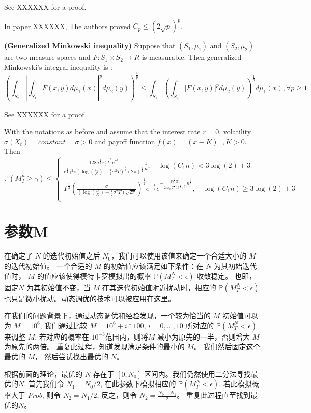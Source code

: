 See XXXXXX for a proof.

In paper XXXXXX, The authors proved $C_p\leq (2\sqrt{p})^p$.

\textbf{(Generalized Minkowski inequality)}
Suppose that $(S_1,\mu_1)$ and $(S_2,\mu_2)$ are two measure spaces and $F : S_1\times S_2\rightarrow R$ is measurable. Then generalized Minkowski's integral inequality is :
\begin{equation}
(\int_{S_2}|\int_{S_1}F(x,y)d\mu_1(x)|^pd\mu_2(y))^{\frac{1}{p}}\leq \int_{S_1}(\int_{S_2}|F(x,y)|^pd\mu_2(y))^{\frac{1}{p}}d\mu_1(x), \forall p\geq 1
\end{equation}

See XXXXXX for a proof

With the notations as before and  assume that the interest rate $r=0$, volatility $\sigma(X_t)=constant=\sigma>0$ and payoff function $f(x)=(x-K)^{+}, K>0$. Then 
\[
\mathbb{P}(M_T^n\geq \gamma)\leq 
\begin{cases}
\frac{128\sigma^{\frac{1}{2}}x_0^2T^{\frac{5}{4}}e^{\sigma^2}}{e^{\frac{1}{4}}\gamma^2\pi (\log(\frac{x_0}{K})+\frac{1}{2}\sigma^2T)^{\frac{1}{2}}(2\pi)^{\frac{1}{4}}}\frac{1}{n}, \quad \log(C_1n)<3\log(2)+3\\
T^{\frac{1}{4}}(\frac{\sigma}{(\log(\frac{x_0}{K})+\frac{1}{2}\sigma^2T)\sqrt{2\pi}})^{\frac{1}{2}}e^{-\frac{1}{4}}e^{-\frac{3\gamma^{\frac{2}{3}}\pi^{\frac{1}{3}}}{2ex_0^{\frac{2}{3}}T^{\frac{1}{3}}16^{\frac{1}{3}}e^{\frac{\sigma^2}{3}}}n^{\frac{1}{3}}}, \quad \log(C_1n)\geq 3\log(2)+3\\
\end{cases}
\]


\section{参数M} %
\label{sec:M}
在确定了 $N$ 的迭代初始值之后 $N_0$，我们可以使用该值来确定一个合适大小的 $M$ 的迭代初始值。
一个合适的 $M$ 的初始值应该满足如下条件：在 $N$ 为其初始迭代值时， $M$ 的值应该使得模特卡罗模拟出的概率 $\mathbb{P}(M_T^N<\epsilon)$ 收敛稳定。
也即，固定$N$ 为其初始值不变，当 $M$ 在其迭代初始值附近扰动时，相应的 $\mathbb{P}(M_T^N<\epsilon)$ 也只是微小扰动。动态调优的技术可以被应用在这里。

在我们的问题背景下，通过动态调优和经验发现，一个较为恰当的 $M$ 初始值可以为 $M=10^6$, 我们通过比较 $M=10^6+i*100$, $i=0,...,10$ 
所对应的 $\mathbb{P}(M_T^N<\epsilon)$来调整 $M$, 若对应的概率在 $10^{-3}$范围内，则将$M$ 减小为原先的一半，否则增大 $M$ 为原先的两倍。
重复此过程，知道发现满足条件的最小的 $M$。 我们然后固定这个最优的 $M$， 然后尝试找出最优的 $N$。

根据前面的理论，最优的 $N$ 存在于 $[0, N_0]$ 区间内。我们仍然使用二分法寻找最优的$N$, 首先我们令 $N_1=N_0/2$, 在此参数下模拟相应的
$\mathbb{P}(M_T^N<\epsilon)$, 若此模拟概率大于 $Prob$, 则令 $N_2=N_1/2$, 反之，则令 $N_2=\frac{N_0+N_1}{2}$。
重复此过程直至找到最优的$N$。





